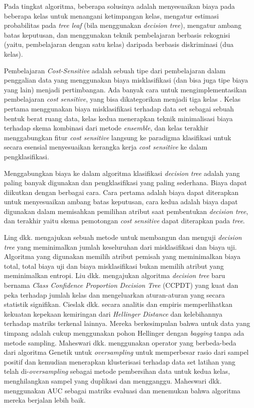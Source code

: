 \documentclass[12pt,a4paper,titlepage]{article}
\begin{document}
Pada tingkat algoritma, beberapa solusinya adalah menyesuaikan biaya pada beberapa kelas untuk menangani ketimpangan kelas, mengatur estimasi probabilitas pada \textit{tree leaf} (bila menggunakan \textit{decision tree}), mengatur ambang batas keputusan, dan menggunakan teknik pembelajaran berbasis rekognisi (yaitu, pembelajaran dengan satu kelas) daripada berbasis diskriminasi (dua kelas).

Pembelajaran \textit{Cost-Sensitive} adalah sebuah tipe dari pembelajaran dalam penggalian data yang menggunakan biaya misklasifikasi (dan bisa juga tipe biaya yang lain) menjadi pertimbangan.
Ada banyak cara untuk mengimplementasikan pembelajaran \textit{cost sensitive}, yang bisa dikategorikan menjadi tiga kelas \cite{he2009learning}.
Kelas pertama menggunakan biaya misklasifikasi terhadap data set sebagai sebuah bentuk berat ruang data, kelas kedua menerapkan teknik minimalisasi biaya terhadap skema kombinasi dari metode \textit{ensemble}, dan kelas terakhir menggabungkan fitur \textit{cost sensitive} langsung ke paradigma klasifikasi untuk secara esensial menyesuaikan kerangka kerja \textit{cost sensitive} ke dalam pengklasifikasi.

Menggabungkan biaya ke dalam algoritma klasifikasi \textit{decision tree} adalah yang paling banyak digunakan dan pengklasifikasi yang paling sederhana.
Biaya dapat diikutkan dengan berbagai cara.
Cara pertama adalah biaya dapat diterapkan untuk menyesuaikan ambang batas keputusan, cara kedua adalah biaya dapat digunakan dalam memisahkan pemilihan atribut saat pembentukan \textit{decision tree}, dan terakhir yaitu skema pemotongan \textit{cost sensitive} dapat diterapkan pada \textit{tree}.

Ling dkk. \cite{ling2004decision} mengajukan sebuah metode untuk membangun dan menguji \textit{decision tree} yang meminimalkan jumlah keseluruhan dari misklasifikasi dan biaya uji. Algoritma yang digunakan memilih atribut pemisah yang meminimalkan biaya total, total biaya uji dan biaya misklasifikasi bukan memilih atribut yang meminimalkan entropi. Liu dkk. \cite{liu2010robust} mengajukan algoritma \textit{decision tree} baru bernama \textit{Class Confidence Proportion Decision Tree} (CCPDT) yang kuat dan peka terhadap jumlah kelas dan mengeluarkan aturan-aturan yang secara statistik signifikan.
Cieslak dkk. \cite{cieslak2012hellinger} secara analitis dan empiris memperlihatkan kekuatan kepekaan kemiringan dari \textit{Hellinger Distance} dan kelebihannya terhadap matriks terkenal lainnya.
Mereka berkesimpulan bahwa untuk data yang timpang adalah cukup menggunakan pohon Hellinger dengan \textit{bagging} tanpa ada metode sampling.
Maheswari dkk. \cite{maheshwari2011new} menggunakan operator yang berbeda-beda dari algoritma Genetik untuk \textit{oversampling} untuk memperbesar rasio dari sampel positif dan kemudian menerapkan klusterisasi terhadap data set latihan yang telah di-\textit{oversampling} sebagai metode pembersihan data untuk kedua kelas, menghilangkan sampel yang duplikasi dan mengganggu.
Maheswari dkk. menggunakan AUC sebagai matriks evaluasi dan menemukan bahwa algoritma mereka berjalan lebih baik.
\end{document}
